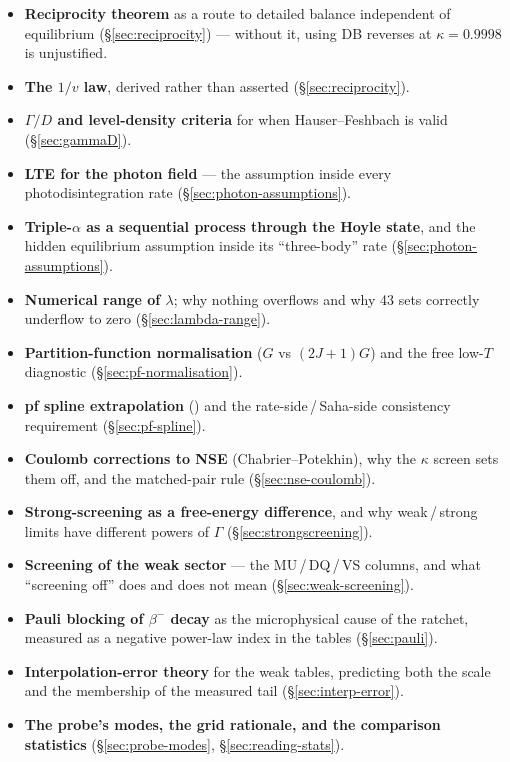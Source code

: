 \begin{itemize}
\item \textbf{Reciprocity theorem} as a route to detailed balance independent of
      equilibrium (\S\ref{sec:reciprocity}) --- without it, using DB reverses at
      $\kappa = 0.9998$ is unjustified.
\item \textbf{The $1/v$ law}, derived rather than asserted
      (\S\ref{sec:reciprocity}).
\item \textbf{$\Gamma/D$ and level-density criteria} for when Hauser--Feshbach
      is valid (\S\ref{sec:gammaD}).
\item \textbf{LTE for the photon field} --- the assumption inside every
      photodisintegration rate (\S\ref{sec:photon-assumptions}).
\item \textbf{Triple-$\alpha$ as a sequential process through the Hoyle state},
      and the hidden equilibrium assumption inside its ``three-body'' rate
      (\S\ref{sec:photon-assumptions}).
\item \textbf{Numerical range of $\lambda$}; why nothing overflows and why 43
      sets correctly underflow to zero (\S\ref{sec:lambda-range}).
\item \textbf{Partition-function normalisation} ($G$ vs $(2J+1)G$) and the free
      low-$T$ diagnostic (\S\ref{sec:pf-normalisation}).
\item \textbf{pf spline extrapolation} () and the
      rate-side\,/\,Saha-side consistency requirement (\S\ref{sec:pf-spline}).
\item \textbf{Coulomb corrections to NSE} (Chabrier--Potekhin), why the $\kappa$
      screen sets them off, and the matched-pair rule
      (\S\ref{sec:nse-coulomb}).
\item \textbf{Strong-screening as a free-energy difference}, and why
      weak\,/\,strong limits have different powers of $\Gamma$
      (\S\ref{sec:strongscreening}).
\item \textbf{Screening of the weak sector} --- the MU\,/\,DQ\,/\,VS columns,
      and what ``screening off'' does and does not mean
      (\S\ref{sec:weak-screening}).
\item \textbf{Pauli blocking of $\beta^-$ decay} as the microphysical cause of
      the \Ye{} ratchet, measured as a negative power-law index in the tables
      (\S\ref{sec:pauli}).
\item \textbf{Interpolation-error theory} for the weak tables, predicting both
      the scale and the membership of the measured tail
      (\S\ref{sec:interp-error}).
\item \textbf{The probe's modes, the grid rationale, and the comparison
      statistics} (\S\ref{sec:probe-modes}, \S\ref{sec:reading-stats}).
\end{itemize}

